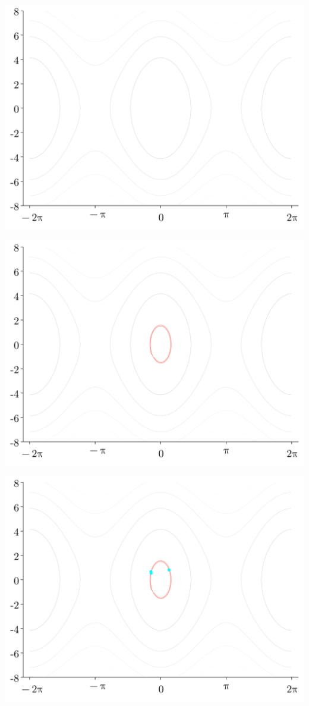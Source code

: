\documentclass[
]{report}
\begin{document}
\includegraphics{contents/assets/neuralpbc/000.svg}

\includegraphics{contents/assets/neuralpbc/001.svg}

\includegraphics{contents/assets/neuralpbc/002.svg}
\end{document}

